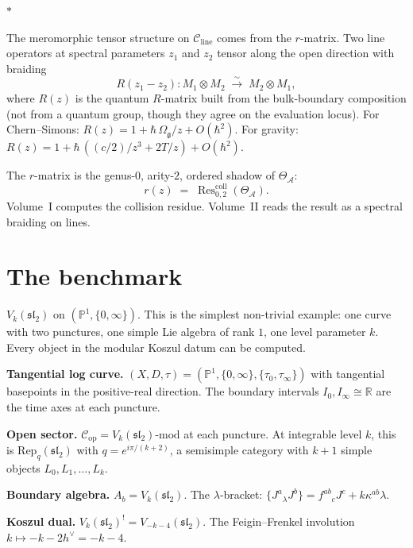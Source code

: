 \documentclass[11pt]{article}
\newcommand{\cA}{\mathcal{A}}
\newcommand{\cC}{\mathcal{C}}
\newcommand{\fg}{\mathfrak{g}}
\newcommand{\fsl}{\mathfrak{sl}}
\newcommand{\R}{\mathbb{R}}
\newcommand{\bP}{\mathbb{P}}
\newcommand{\Res}{\operatorname{Res}}
\newcommand{\sep}{\bigskip\begin{center}$*$\end{center}\medskip}
\begin{document}
\sep

The meromorphic tensor structure on $\cC_{\mathrm{line}}$ comes
from the $r$-matrix.  Two line operators at spectral
parameters $z_1$ and $z_2$ tensor along the open direction with
braiding
\[
R(z_1 - z_2)\colon M_1 \otimes M_2
\;\xrightarrow{\sim}\;
M_2 \otimes M_1,
\]
where $R(z)$ is the quantum $R$-matrix built from the bulk-boundary
composition (not from a quantum group, though they agree on the
evaluation locus).  For Chern--Simons:
$R(z) = 1 + \hbar\,\Omega_\fg/z + O(\hbar^2)$.  For gravity:
$R(z) = 1 + \hbar\,((c/2)/z^3 + 2T/z) + O(\hbar^2)$.

The $r$-matrix is the genus-$0$, arity-$2$, ordered shadow of
$\Theta_\cA$:
\[
r(z) \;=\; \Res^{\mathrm{coll}}_{0,2}(\Theta_\cA).
\]
Volume~I computes the collision residue.  Volume~II reads the
result as a spectral braiding on lines.


\section{The benchmark}
\label{sec:benchmark}

$V_k(\fsl_2)$ on $(\bP^1, \{0, \infty\})$.  This is the
simplest non-trivial example: one curve with two punctures, one
simple Lie algebra of rank $1$, one level parameter $k$.  Every
object in the modular Koszul datum can be computed.

\medskip

\noindent
\textbf{Tangential log curve.}
$(X, D, \tau) = (\bP^1, \{0,\infty\}, \{\tau_0, \tau_\infty\})$
with tangential basepoints in the positive-real direction.  The
boundary intervals $I_0, I_\infty \cong \R$ are the time axes at
each puncture.

\medskip

\noindent
\textbf{Open sector.}
$\cC_{\mathrm{op}} = V_k(\fsl_2)\text{-mod}$ at each puncture.
At integrable level $k$, this is $\mathrm{Rep}_q(\fsl_2)$ with
$q = e^{i\pi/(k+2)}$, a semisimple category with $k+1$ simple
objects $L_0, L_1, \ldots, L_k$.

\medskip

\noindent
\textbf{Boundary algebra.}
$A_b = V_k(\fsl_2)$.  The $\lambda$-bracket:
$\{J^a{}_\lambda J^b\} = f^{ab}{}_c J^c + k\kappa^{ab}\lambda$.

\medskip

\noindent
\textbf{Koszul dual.}
$V_k(\fsl_2)^! = V_{-k-4}(\fsl_2)$.  The Feigin--Frenkel
involution $k \mapsto -k - 2h^\vee = -k - 4$.
\end{document}
